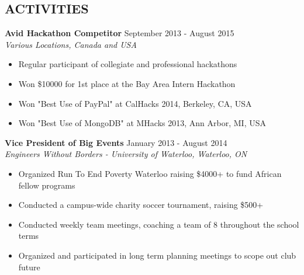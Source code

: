 \documentclass[10pt]{res} %
\begin{document}
\begin{resume}

\vspace{0.2in} %


\section{ACTIVITIES} 

\vspace{0.2in} %

\textbf{Avid Hackathon Competitor} \hfill September 2013 - August 2015 \\
{\sl Various Locations, Canada and USA }
\begin{itemize} 
    \item Regular participant of collegiate and professional hackathons
    \item Won \$10000 for 1st place at the Bay Area Intern Hackathon
    \item Won "Best Use of PayPal" at CalHacks 2014, Berkeley, CA, USA
    \item Won "Best Use of MongoDB" at MHacks 2013, Ann Arbor, MI, USA
\end{itemize}

\textbf{Vice President of Big Events} \hfill January 2013 - August 2014 \\
{\sl Engineers Without Borders - University of Waterloo, Waterloo, ON }
\begin{itemize}  %
    \item Organized Run To End Poverty Waterloo raising \$4000+ to fund African fellow programs
    \item Conducted a campus-wide charity soccer tournament, raising \$500+
    \item Conducted weekly team meetings, coaching a team of 8 throughout the school terms
    \item Organized and participated in long term planning meetings to scope out club future
\end{itemize}



\end{resume}
\end{document}

